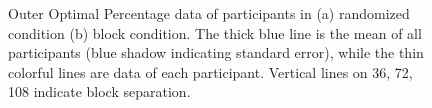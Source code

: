 \begin{figure}[ht]
\centering
{}
\decoRule
\caption[Outer Optimal Percentage data of participants]{Outer Optimal Percentage data of participants in (a) randomized condition (b) block condition. The thick blue line is the mean of all participants (blue shadow indicating standard error), while the thin colorful lines are data of each participant. Vertical lines on 36, 72, 108 indicate block separation. }
\label{fig:Outer Optimal Percentage Participants}
\end{figure}

